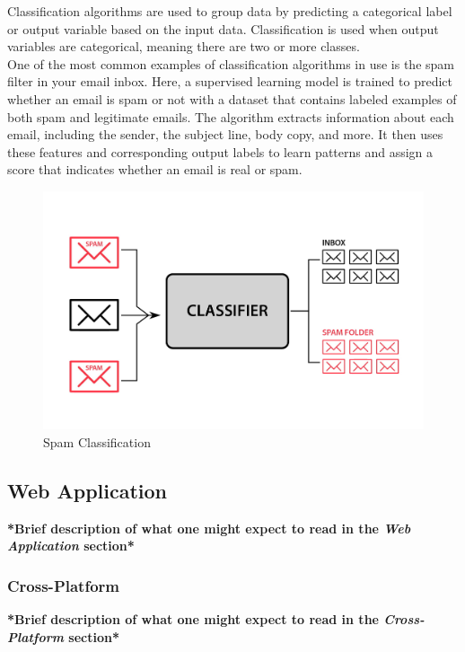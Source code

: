Classification algorithms are used to group data by predicting a categorical label or output variable based on the input data. Classification is used when output variables are categorical, meaning there are two or more classes. \cite{google:supervised-learning} \\

One of the most common examples of classification algorithms in use is the spam filter in your email inbox. Here, a supervised learning model is trained to predict whether an email is spam or not with a dataset that contains labeled examples of both spam and legitimate emails. The algorithm extracts information about each email, including the sender, the subject line, body copy, and more. It then uses these features and corresponding output labels to learn patterns and assign a score that indicates whether an email is real or spam. \cite{google:supervised-learning}

\begin{figure}[h!]
    \centering
    \includegraphics[width=0.75\linewidth]{figures/theory/classification.jpg}
    \caption{Spam Classification}
    \label{fig:classification}
\end{figure}

\subsection{Web Application}

\textbf{*Brief description of what one might expect to read in the \textit{Web Application} section*}

\subsubsection*{Cross-Platform}

\textbf{*Brief description of what one might expect to read in the \textit{Cross-Platform} section*}

